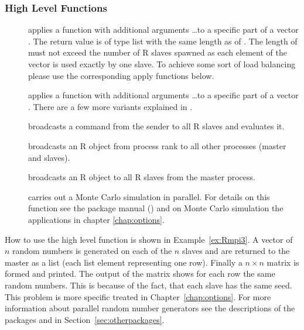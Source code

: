 \subsubsection{High Level Functions}
\begin{description}
\item[] applies a function
   with additional arguments \ldots to a specific part of
  a vector . The return value is of type list with the same
  length as of . The length of
   must not exceed the 
  number of R slaves spawned as each element of the vector is used
  exactly by one slave. To achieve some sort of load balancing please
  use the corresponding apply functions below.
\item[] applies a function
   with additional arguments \ldots to a specific part of
  a vector . There are a few more variants explained in
  \cite{yu06Rmpi}.
\item[]
  broadcasts a command  from the sender  to
  all R slaves and evaluates it.
\item[]
  broadcasts an R object  from process rank 
  to all other processes (master and slaves).
\item[] broadcasts an R
  object  to all R slaves from the master process. 
\item[] carries out a Monte Carlo simulation
  in parallel. For details on this function see the package manual
  (\cite{yu06Rmpi}) and on Monte Carlo simulation
  the applications in chapter \ref{chap:options}.
\end{description}

How to use the high level function  is shown in
Example~\ref{ex:Rmpi3}. A vector of $n$ random numbers is generated on
each of the $n$ slaves and are returned to the master as a
list (each list element representing one row). Finally a $n  \times n$
matrix is formed and printed. The output of the matrix shows for each
row the same random numbers. This is because of the fact, that each
slave has the same seed. This problem is more specific treated in
Chapter~\ref{chap:options}. For more information about parallel random
number generators see the descriptions of the packages 
and  in Section~\ref{sec:otherpackages}.


